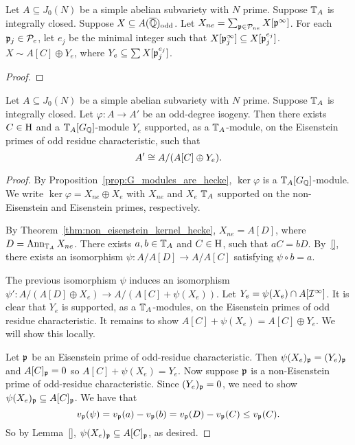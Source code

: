\documentclass[thesis.tex]{subfiles}
\begin{document}
\begin{proposition}
    Let $A\subseteq J_0(N)$ be a simple abelian subvariety with $N$ prime.
    Suppose $\mathbb{T}_A$ is integrally closed. Suppose $X\subseteq A(\overline{\mathbb{Q}})_{\mathrm{odd}}$.
    Let $X_{ne} = \sum_{\mathfrak{p} \in \mathcal{P}_{ne}} X[\mathfrak{p}^\infty]$. For each $\mathfrak{p}_j\in \mathcal{P}_e$,
    let $e_j$ be the minimal integer such that $X[\mathfrak{p}_j ^\infty]\subseteq X[\mathfrak{p}_j
    ^{e_j}]$. $X\sim A[C]\oplus Y_e$, where $Y_e\subseteq \sum X[\mathfrak{p}_j ^{e_j}]$.
\end{proposition}
\begin{proof}
    
\end{proof}

\begin{proposition}
    \label{prop:reduce}
    Let $A\subseteq J_0(N)$ be a simple abelian subvariety with $N$ prime.
    Suppose $\mathbb{T}_A$ is integrally closed. Let $\varphi:A\to A'$ be an
    odd-degree isogeny. Then there exists $C\in \operatorname{H}$ and a $\mathbb{T}_A[G_{\mathbb{Q}}]$-module
    $Y_e$ supported, as a $\mathbb{T}_A$-module, on the Eisenstein primes of odd
    residue characteristic, such that
    \[
        A'\cong A/(A[C]\oplus Y_e).
    \]
\end{proposition}
\begin{proof}
    By Proposition~\ref{prop:G_modules_are_hecke}, $\ker\varphi$ is a
    $\mathbb{T}_A[G_{\mathbb{Q}}]$-module. We write $\ker\varphi = X_{ne} \oplus X_e$ with
    $X_{ne}$ and $X_e$ $\mathbb{T}_A$ supported on the non-Eisenstein and Eisenstein
    primes, respectively.

    By Theorem~\ref{thm:non_eisenstein_kernel_hecke}, $X_{ne} = A[D]$, where
    $D=\operatorname{Ann}_{\mathbb{T}_A} X_{ne}$. There exists $a,b\in \mathbb{T}_A$ and $C\in \operatorname{H}$, such
    that $aC=bD$. By~\ref{}, there exists an isomorphism $\psi:A/A[D]\to
    A/A[C]$ satisfying $\psi \circ b = a$.

    The previous isomorphism $\psi$ induces an isomorphism $\psi':A/(A[D]\oplus
    X_e)\to A/(A[C] + \psi(X_e))$. Let $Y_e = \psi(X_e)\cap A[\mathcal{I}^\infty]$. It
    is clear that $Y_e$ is supported, as a $\mathbb{T}_A$-modules, on the Eisenstein
    primes of odd residue characteristic. It remains to show $A[C] + \psi(X_e)
    = A[C]\oplus Y_e$. We will show this locally.

    Let $\mathfrak{p}$ be an Eisenstein prime of odd-residue characteristic. Then
    $\psi(X_e)_{\mathfrak{p}} = (Y_e)_{\mathfrak{p}}$ and $A[C]_{\mathfrak{p}}=0$ so $A[C]+\psi(X_e)=Y_e$. Now
    suppose $\mathfrak{p}$ is a non-Eisenstein prime of odd-residue characteristic. Since
    $(Y_e)_{\mathfrak{p}} = 0$, we need to show $\psi(X_e)_{\mathfrak{p}} \subseteq A[C]_{\mathfrak{p}}$. We have
    that
    \[
        v_{\mathfrak{p}}(\psi) =  v_{\mathfrak{p}}(a)-v_{\mathfrak{p}}(b) = v_{\mathfrak{p}}(D) - v_{\mathfrak{p}}(C) \leq v_{\mathfrak{p}}(C).
    \] 
    So by Lemma~\ref{}, $\psi(X_e)_{\mathfrak{p}} \subseteq A[C]_{\mathfrak{p}}$, as desired.
\end{proof}
\end{document}
